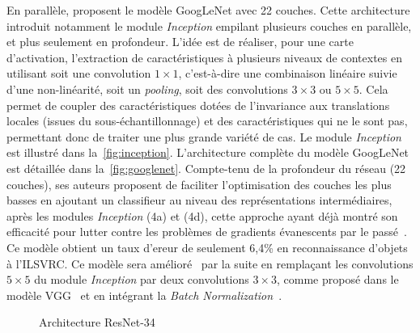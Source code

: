 En parallèle, \citet{szegedy_going_2015} proposent le modèle GoogLeNet avec 22 couches. Cette architecture introduit notamment le module \emph{Inception} empilant plusieurs couches en parallèle, et plus seulement en profondeur. L'idée est de réaliser, pour une carte d'activation, l'extraction de caractéristiques à plusieurs niveaux de contextes en utilisant soit une convolution $1\times1$, c'est-à-dire une combinaison linéaire suivie d'une non-linéarité, soit un \emph{pooling}, soit des convolutions $3\times3$ ou $5\times5$. Cela permet de coupler des caractéristiques dotées de l'invariance aux translations locales (issues du sous-échantillonnage) et des caractéristiques qui ne le sont pas, permettant donc de traiter une plus grande variété de cas. Le module \emph{Inception} est illustré dans la~\cref{fig:inception}. L'architecture complète du modèle GoogLeNet est détaillée dans la~\cref{fig:googlenet}. Compte-tenu de la profondeur du réseau (22 couches), ses auteurs proposent de faciliter l'optimisation des couches les plus basses en ajoutant un classifieur au niveau des représentations intermédiaires, après les modules \emph{Inception} (4a) et (4d), cette approche ayant déjà montré son efficacité pour lutter contre les problèmes de gradients évanescents par le passé~\cite{lee_deeply-supervised_2015}. Ce modèle obtient un taux d'ereur de seulement 6,4\% en reconnaissance d'objets à l'\gls{ILSVRC}. Ce modèle sera amélioré~\cite{szegedy_rethinking_2015} par la suite en remplaçant les convolutions $5\times5$ du module \emph{Inception} par deux convolutions $3\times3$, comme proposé dans le modèle VGG~\cite{simonyan_very_2014} et en intégrant la \emph{Batch Normalization}~\cite{ioffe_batch_2015}.

\begin{figure}[t]
  \resizebox{\textwidth}{!}{
    
  }
  \caption{Architecture ResNet-34~\cite{he_deep_2016}}
  \label{fig:resnet}
\end{figure}

